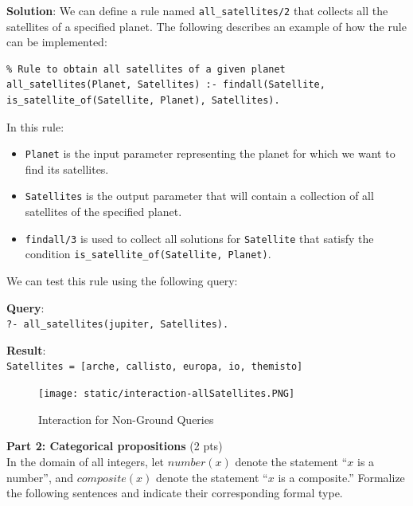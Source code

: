 \documentclass[12pt]{article}
\begin{document}
\begin{spacing}{1.5}
\begin{enumerate}
		      \textbf{Solution}: We can define a rule named \texttt{all\_satellites/2} that collects all the satellites of a specified planet. The following describes an example of how the rule can be implemented:\\

		      \begin{lstlisting}
% Rule to obtain all satellites of a given planet
all_satellites(Planet, Satellites) :- findall(Satellite, is_satellite_of(Satellite, Planet), Satellites).
		      \end{lstlisting}

		      In this rule:
		      \begin{itemize}
		      	\item \texttt{Planet} is the input parameter representing the planet for which we want to           find its satellites.
		      	       
		      	\item \texttt{Satellites} is the output parameter that will contain a collection of all satellites of the specified planet.
		      	       
		      	\item \texttt{findall/3} is used to collect all solutions for \texttt{Satellite} that satisfy the condition \texttt{is\_satellite\_of(Satellite, Planet)}.
		      \end{itemize}

		      We can test this rule using the following query:

		      \textbf{Query}:\\
		      \texttt{?- all\_satellites(jupiter, Satellites).}

		      \textbf{Result}:\\
		      \texttt{Satellites = [arche, callisto, europa, io, themisto]}\\

            \begin{figure}[htp]
                \centering
                \texttt{[image: static/interaction-allSatellites.PNG]}
                \caption{Interaction for Non-Ground Queries}
                \label{fig:figure}
            \end{figure}
	\end{enumerate}

    \newpage
	\noindent \textbf{Part 2: Categorical propositions} (2 pts)\\
	In the domain of all integers, let $number(x)$ denote the statement “$x$ is a number”, and $composite(x)$ denote the statement “$x$ is a composite.” Formalize the following sentences and indicate their corresponding formal type.\\
							

\end{spacing}
\end{document}
